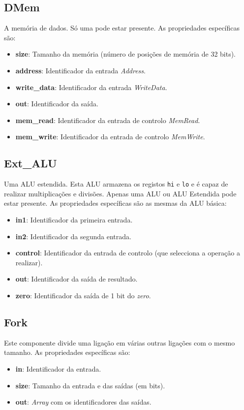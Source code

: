 \documentclass[11pt,a4paper,twoside,titlepage]{report}
\begin{document}
\subsection{DMem}

A memória de dados. Só uma pode estar presente. As propriedades específicas são:
\begin{itemize}
	\item \textbf{size}: Tamanho da memória (número de posições de memória de
		32 bits).
	\item \textbf{address}: Identificador da entrada \emph{Address}.
	\item \textbf{write\_data}: Identificador da entrada \emph{WriteData}.
	\item \textbf{out}: Identificador da saída.
	\item \textbf{mem\_read}: Identificador da entrada de controlo \emph{MemRead}.
	\item \textbf{mem\_write}: Identificador da entrada de controlo \emph{MemWrite}.
\end{itemize}

\subsection{Ext\_ALU}

Uma ALU estendida. Esta ALU armazena os registos \verb+hi+ e \verb+lo+ e é capaz
de realizar multiplicações e divisões.
Apenas uma ALU ou ALU Estendida pode estar presente. As propriedades específicas
são as mesmas da ALU básica:
\begin{itemize}
	\item \textbf{in1}: Identificador da primeira entrada.
	\item \textbf{in2}: Identificador da segunda entrada.
	\item \textbf{control}: Identificador da entrada de controlo (que selecciona
		a operação a realizar).
	\item \textbf{out}: Identificador da saída de resultado.
	\item \textbf{zero}: Identificador da saída de 1 bit do \emph{zero}.
\end{itemize}

\subsection{Fork}

Este componente divide uma ligação em várias outras ligações com o mesmo tamanho.
As propriedades específicas são:
\begin{itemize}
	\item \textbf{in}: Identificador da entrada.
	\item \textbf{size}: Tamanho da entrada e das saídas (em bits).
	\item \textbf{out}: \emph{Array} com os identificadores das saídas.
\end{itemize}
\end{document}
